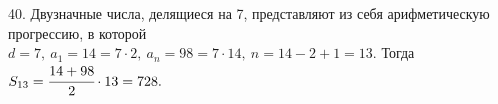 40. Двузначные числа, делящиеся на 7, представляют из себя арифметическую прогрессию, в которой $d=7,\ a_1=14=7\cdot2,\ a_n=98=7\cdot14,\ n=14-2+1=13.$ Тогда
$S_{13}=\cfrac{14+98}{2}\cdot13=728.$\\
